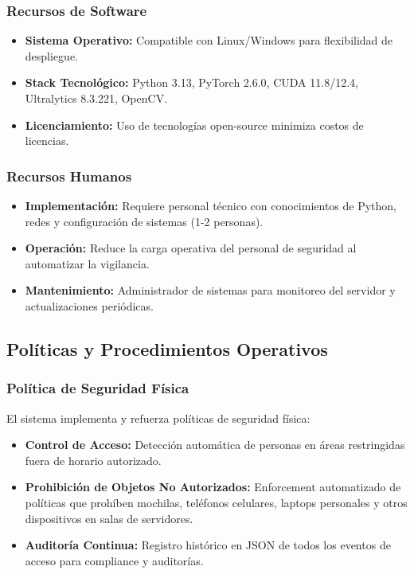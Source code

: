 \documentclass[12pt, a4paper]{article}
\begin{document}
\begin{itemize}
\subsubsection{Recursos de Software}
\begin{itemize}
\item \textbf{Sistema Operativo:} Compatible con Linux/Windows para flexibilidad de despliegue.
\item \textbf{Stack Tecnológico:} Python 3.13, PyTorch 2.6.0, CUDA 11.8/12.4, Ultralytics 8.3.221, OpenCV.
\item \textbf{Licenciamiento:} Uso de tecnologías open-source minimiza costos de licencias.
\end{itemize}

\subsubsection{Recursos Humanos}
\begin{itemize}
\item \textbf{Implementación:} Requiere personal técnico con conocimientos de Python, redes y configuración de sistemas (1-2 personas).
\item \textbf{Operación:} Reduce la carga operativa del personal de seguridad al automatizar la vigilancia.
\item \textbf{Mantenimiento:} Administrador de sistemas para monitoreo del servidor y actualizaciones periódicas.
\end{itemize}

\subsection{Políticas y Procedimientos Operativos}

\subsubsection{Política de Seguridad Física}
El sistema implementa y refuerza políticas de seguridad física:
\begin{itemize}
\item \textbf{Control de Acceso:} Detección automática de personas en áreas restringidas fuera de horario autorizado.
\item \textbf{Prohibición de Objetos No Autorizados:} Enforcement automatizado de políticas que prohíben mochilas, teléfonos celulares, laptops personales y otros dispositivos en salas de servidores.
\item \textbf{Auditoría Continua:} Registro histórico en JSON de todos los eventos de acceso para compliance y auditorías.
\end{itemize}


\end{itemize}
\end{document}
